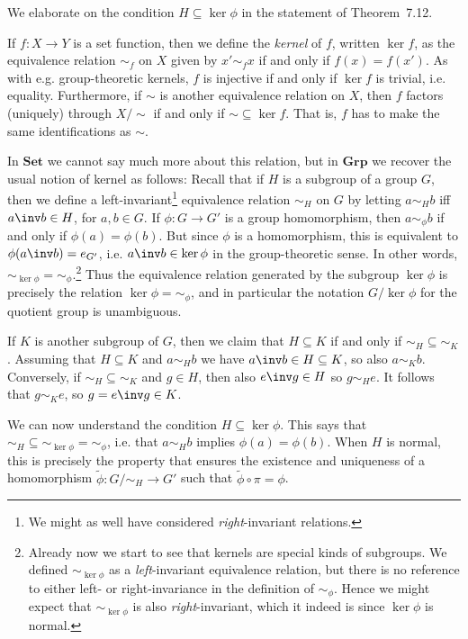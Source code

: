 \documentclass[article, a4paper, 11pt, oneside]{memoir}
\numberwithin{equation}{chapter}
\newcommand{\ncat}[1]{\mathbf{#1}} %
\newcommand{\catSet}{\ncat{Set}} %
\newcommand{\catGrp}{\ncat{Grp}} %
\theoremstyle{nonumberplain}
\begin{document}
\begin{remark}
    We elaborate on the condition $H \subseteq \ker\phi$ in the statement of Theorem~7.12.

    If $f \colon X \to Y$ is a set function, then we define the \emph{kernel} of $f$, written $\ker f$, as the equivalence relation $\sim_f$ on $X$ given by $x' \sim_f x$ if and only if $f(x) = f(x')$. As with e.g. group-theoretic kernels, $f$ is injective if and only if $\ker f$ is trivial, i.e. equality. Furthermore, if $\sim$ is another equivalence relation on $X$, then $f$ factors (uniquely) through $X/{\sim}$ if and only if ${\sim} \subseteq \ker f$. That is, $f$ has to make the same identifications as $\sim$.
    
    In $\catSet$ we cannot say much more about this relation, but in $\catGrp$ we recover the usual notion of kernel as follows: Recall that if $H$ is a subgroup of a group $G$, then we define a left-invariant\footnote{We might as well have considered \emph{right}-invariant relations.} equivalence relation $\sim_H$ on $G$ by letting $a \sim_H b$ iff $a\inv b \in H$, for $a,b \in G$. If $\phi \colon G \to G'$ is a group homomorphism, then $a \sim_\phi b$ if and only if $\phi(a) = \phi(b)$. But since $\phi$ is a homomorphism, this is equivalent to $\phi(a\inv b) = e_{G'}$, i.e. $a\inv b \in \ker\phi$ in the group-theoretic sense. In other words, ${\sim_{\ker\phi}} = {\sim_\phi}$.\footnote{Already now we start to see that kernels are special kinds of subgroups. We defined $\sim_{\ker\phi}$ as a \emph{left}-invariant equivalence relation, but there is no reference to either left- or right-invariance in the definition of $\sim_\phi$. Hence we might expect that $\sim_{\ker\phi}$ is also \emph{right}-invariant, which it indeed is since $\ker\phi$ is normal.} Thus the equivalence relation generated by the subgroup $\ker\phi$ is precisely the relation $\ker\phi = {\sim_\phi}$, and in particular the notation $G/\ker\phi$ for the quotient group is unambiguous.

    If $K$ is another subgroup of $G$, then we claim that $H \subseteq K$ if and only if ${\sim_H} \subseteq {\sim_K}$. Assuming that $H \subseteq K$ and $a \sim_H b$ we have $a\inv b \in H \subseteq K$, so also $a \sim_K b$. Conversely, if ${\sim_H} \subseteq {\sim_K}$ and $g \in H$, then also $e\inv g \in H$ so $g \sim_H e$. It follows that $g \sim_K e$, so $g = e\inv g \in K$.

    We can now understand the condition $H \subseteq \ker\phi$. This says that ${\sim_H} \subseteq {\sim_{\ker\phi}} = {\sim_\phi}$, i.e. that $a \sim_H b$ implies $\phi(a) = \phi(b)$. When $H$ is normal, this is precisely the property that ensures the existence and uniqueness of a homomorphism $\tilde\phi \colon G/{\sim_H} \to G'$ such that $\tilde\phi \circ \pi = \phi$.
\end{remark}
\end{document}
